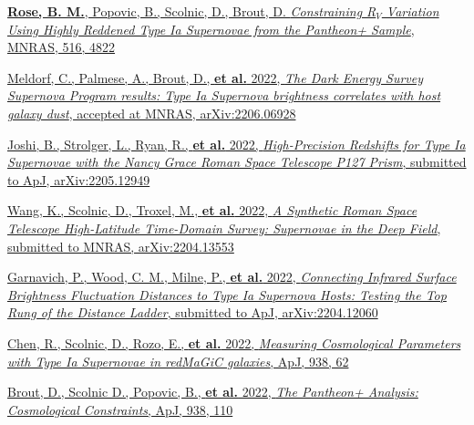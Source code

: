 \documentclass[margin]{res}
\begin{document}
\begin{resume}
\hangindent=15pt 
\href{https://ui.adsabs.harvard.edu/abs/2022MNRAS.tmp.2310R/abstract}{{\bf Rose, B. M.}, Popovic, B., Scolnic, D., Brout, D. {\sl Constraining R$_V$ Variation Using Highly Reddened Type Ia Supernovae from the Pantheon+ Sample}, MNRAS, 516, 4822}
\vspace{-12pt}

\hangindent=15pt 
\href{https://ui.adsabs.harvard.edu/abs/2022arXiv220606928M/abstract}{Meldorf, C., Palmese, A.,  Brout, D., \textbf{et al.} 2022, {\sl The Dark Energy Survey Supernova Program results: Type Ia Supernova brightness correlates with host galaxy dust}, accepted at MNRAS, arXiv:2206.06928}
\vspace{-12pt}

\hangindent=15pt 
\href{https://ui.adsabs.harvard.edu/abs/2022arXiv220512949J/abstract}{Joshi, B., Strolger, L.,  Ryan, R., \textbf{et al.} 2022, {\sl High-Precision Redshifts for Type Ia Supernovae with the Nancy Grace Roman Space Telescope P127 Prism}, submitted to ApJ, arXiv:2205.12949}
\vspace{-12pt}

\hangindent=15pt 
\href{https://ui.adsabs.harvard.edu/abs/2022arXiv220413553W/abstract}{Wang, K., Scolnic, D., Troxel, M., \textbf{et al.} 2022, {\sl A Synthetic Roman Space Telescope High-Latitude Time-Domain Survey: Supernovae in the Deep Field}, submitted to MNRAS, arXiv:2204.13553}
\vspace{-12pt}

\hangindent=15pt 
\href{https://ui.adsabs.harvard.edu/abs/2022arXiv220412060G/abstract}{Garnavich, P., Wood, C. M., Milne, P., \textbf{et al.} 2022, {\sl Connecting Infrared Surface Brightness Fluctuation Distances to Type Ia Supernova Hosts: Testing the Top Rung of the Distance Ladder}, submitted to ApJ, arXiv:2204.12060}
\vspace{-12pt}

\hangindent=15pt 
\href{https://ui.adsabs.harvard.edu/abs/2022arXiv220210480C/abstract}{Chen, R., Scolnic, D., Rozo, E., \textbf{et al.} 2022, {\sl Measuring Cosmological Parameters with Type Ia Supernovae in redMaGiC galaxies}, ApJ, 938, 62}
\vspace{-12pt}

\hangindent=15pt 
\href{https://ui.adsabs.harvard.edu/abs/2022arXiv220204077B/abstract}{Brout, D., Scolnic D., Popovic, B., \textbf{et al.} 2022, {\sl The Pantheon+ Analysis: Cosmological Constraints}, ApJ, 938, 110}
\vspace{-12pt}


\end{resume}
\end{document}
